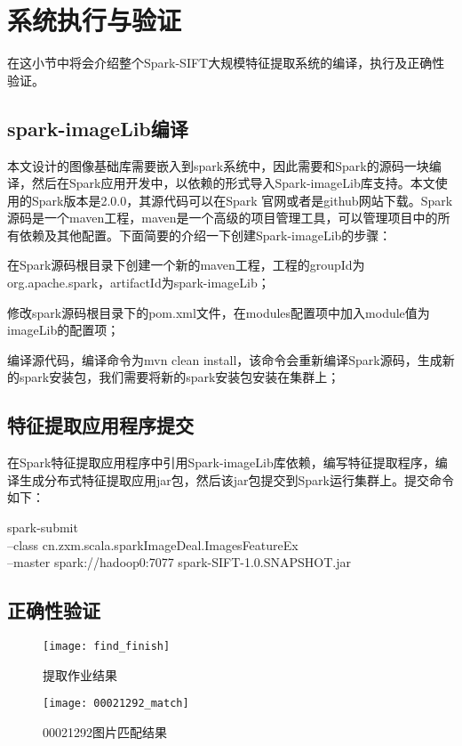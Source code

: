 \section{系统执行与验证}
在这小节中将会介绍整个Spark-SIFT大规模特征提取系统的编译，执行及正确性验证。
\subsection{spark-imageLib编译}
本文设计的图像基础库需要嵌入到spark系统中，因此需要和Spark的源码一块编译，然后在Spark应用开发中，以依赖的形式导入Spark-imageLib库支持。本文使用的Spark版本是2.0.0，其源代码可以在Spark 官网或者是github网站下载。Spark源码是一个maven工程，maven是一个高级的项目管理工具，可以管理项目中的所有依赖及其他配置。下面简要的介绍一下创建Spark-imageLib的步骤：
\begin{compactenum}
\item 在Spark源码根目录下创建一个新的maven工程，工程的groupId为org.apache.spark，artifactId为spark-imageLib；
\item 修改spark源码根目录下的pom.xml文件，在modules配置项中加入module值为imageLib的配置项；
\item 编译源代码，编译命令为mvn clean install，该命令会重新编译Spark源码，生成新的spark安装包，我们需要将新的spark安装包安装在集群上；
\end{compactenum}
\subsection{特征提取应用程序提交}
在Spark特征提取应用程序中引用Spark-imageLib库依赖，编写特征提取程序，编译生成分布式特征提取应用jar包，然后该jar包提交到Spark运行集群上。提交命令如下：
\begin{code}
spark-submit
\\--class cn.zxm.scala.sparkImageDeal.ImagesFeatureEx
\\--master spark://hadoop0:7077
spark-SIFT-1.0.SNAPSHOT.jar
\end{code}
\subsection{正确性验证}
\begin{figure}[htp]
\centering
\texttt{[image: find\_finish]}
\caption{提取作业结果}
\label{fig:find_finish}
\end{figure}

\begin{figure}[htp]
\centering
\texttt{[image: 00021292\_match]}
\caption{00021292图片匹配结果}
\label{fig:00021292_match}
\end{figure}

